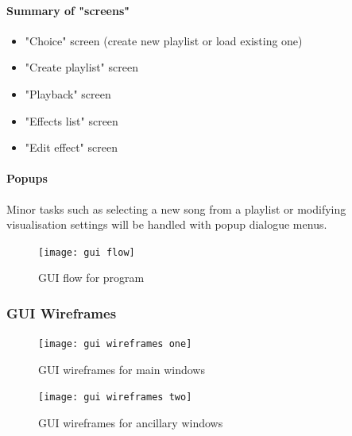 \paragraph{Summary of "screens"}
\begin{itemize}
	\item "Choice" screen (create new playlist or load existing one)
	\item "Create playlist" screen
	\item "Playback" screen
	\item "Effects list" screen
	\item "Edit effect" screen
\end{itemize}

\paragraph{Popups}
Minor tasks such as  selecting a new song from a playlist or modifying visualisation settings will be handled with popup dialogue menus.

\begin{figure}[H]
	\texttt{[image: gui flow]}
	\caption{GUI flow for program }
\end{figure}

\subsubsection{GUI Wireframes}

\begin{figure}[H]
	\texttt{[image: gui wireframes one]}
	\caption{GUI wireframes for main windows }
\end{figure}

\begin{figure}[H]
	\texttt{[image: gui wireframes two]}
	\caption{GUI wireframes for ancillary windows }
\end{figure}

